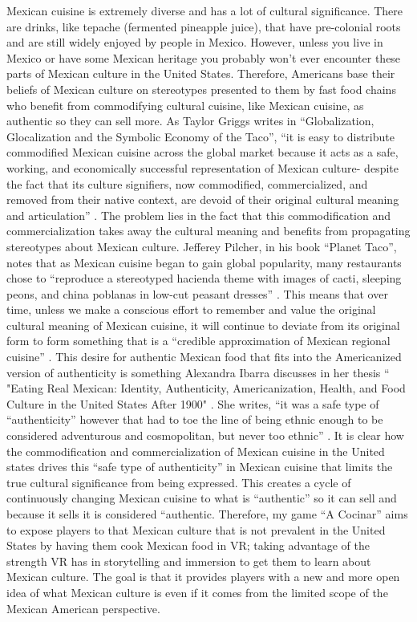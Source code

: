 \documentclass[10pt,twocolumn]{article}
\begin{document}
Mexican cuisine is extremely diverse and has a lot of cultural significance. There are drinks, like tepache (fermented pineapple juice), that have pre-colonial roots and are still widely enjoyed by people in Mexico. However, unless you live in Mexico or have some Mexican heritage you probably won’t ever encounter these parts of Mexican culture in the United States. Therefore, Americans base their beliefs of Mexican culture on stereotypes presented to them by fast food chains who benefit from commodifying cultural cuisine, like Mexican cuisine, as authentic so they can sell more. As Taylor Griggs writes in “Globalization, Glocalization and the Symbolic Economy of the Taco”, “it is easy to distribute commodified Mexican cuisine across the global market because it acts as a safe, working, and economically successful representation of Mexican culture- despite the fact that its culture signifiers, now commodified, commercialized, and removed from their native context, are devoid of their original cultural meaning and articulation” \cite{tacoEcon2017}. The problem lies in the fact that this commodification and commercialization takes away the cultural meaning and benefits from propagating stereotypes about Mexican culture. Jefferey Pilcher, in his book “Planet Taco”, notes that as Mexican cuisine began to gain global popularity, many restaurants chose to “reproduce a stereotyped hacienda theme with images of cacti, sleeping peons, and china poblanas in low-cut peasant dresses” \cite{planetTaco2012}. This means that over time, unless we make a conscious effort to remember and value the original cultural meaning of Mexican cuisine, it will continue to deviate from its original form to form something that is a “credible approximation of Mexican regional cuisine” \cite{planetTaco2012}. This desire for authentic Mexican food that fits into the Americanized version of authenticity is something Alexandra Ibarra discusses in her thesis “ "Eating Real Mexican: Identity, Authenticity, Americanization, Health, and Food Culture in the United States After 1900" \cite{realMex2022}. She writes, “it was a safe type of “authenticity” however that had to toe the line of being ethnic enough to be considered adventurous and cosmopolitan, but never too ethnic” \cite{realMex2022}. It is clear how the commodification and commercialization of Mexican cuisine in the United states drives this “safe type of authenticity” in Mexican cuisine that limits the true cultural significance from being expressed. This creates a cycle of continuously changing Mexican cuisine to what is “authentic” so it can sell and because it sells it is considered “authentic. Therefore, my game “A Cocinar” aims to expose players to that Mexican culture that is not prevalent in the United States by having them cook Mexican food in VR; taking advantage of the strength VR has in storytelling and immersion to get them to learn about Mexican culture. The goal is that it provides players with a new and more open idea of what Mexican culture is even if it comes from the limited scope of the Mexican American perspective.
 
\end{document}
